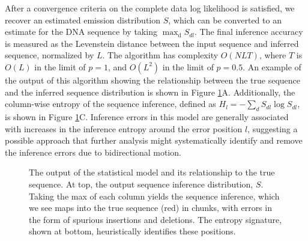 \documentclass{biophys_letter}
\begin{document}
After a convergence criteria on the complete data log likelihood is satisfied, we recover an estimated emission distribution $S$, which can be converted to an estimate for the DNA sequence by taking $\mathrm{\max_{d}} {S_{dl}}$.
The final inference accuracy is measured as the Levenstein distance between the input sequence and inferred sequence, normalized by $L$.
The algorithm has complexity $O(NLT)$, where $T$ is $O(L)$ in the limit of $p=1$, and $O(L^2)$ in the limit of $p=0.5$.
An example of the output of this algorithm showing the relationship between the true sequence and the inferred sequence distribution is shown in Figure \ref{fig:inference_output}A.
Additionally, the column-wise entropy of the sequence inference, defined as $H_{l}=-\sum_{d}S_{dl}\log{S_{dl}}$, is shown in Figure \ref{fig:inference_output}C.
Inference errors in this model are generally associated with increases in the inference entropy around the error position $l$, suggesting a possible approach that further analysis might systematically identify and remove the inference errors due to bidirectional motion.

\begin{figure}
  \caption{The output of the statistical model and its relationship to the true sequence. At top, the output sequence inference distribution, $S$. Taking the max of each column yields the sequence inference, which we see maps into the true sequence (red) in chunks, with errors in the form of spurious insertions and deletions. The entropy signature, shown at bottom, heuristically identifies these positions.}
\label{fig:inference_output}
\end{figure}
\end{document}
